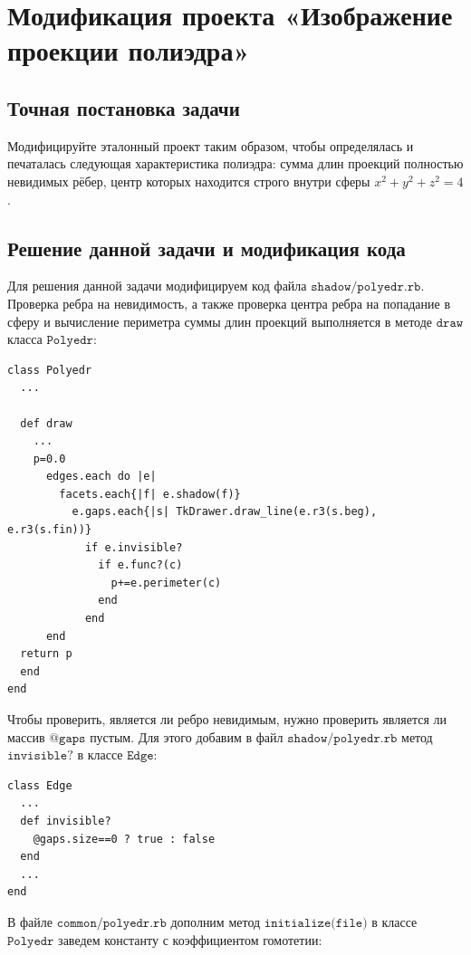 \section{Модификация проекта «Изображение проекции полиэдра»}

\subsection*{Точная постановка задачи}
Модифицируйте эталонный проект таким образом, 
чтобы определялась и печаталась следующая характеристика полиэдра: 
сумма длин проекций полностью невидимых рёбер, центр которых находится 
строго внутри сферы $x^2+y^2+z^2=4$.

\subsection*{Решение данной задачи и модификация кода}
Для решения данной задачи модифицируем код файла $\texttt{shadow/polyedr.rb}$.
Проверка ребра на невидимость, а также проверка центра ребра на попадание в 
сферу и вычисление периметра суммы длин проекций выполняется в методе $\texttt{draw}$ класса $\texttt{Polyedr}$:


\begin{small}
\begin{verbatim}
class Polyedr 
  ...

  def draw
    ...
    p=0.0
      edges.each do |e|
        facets.each{|f| e.shadow(f)}
          e.gaps.each{|s| TkDrawer.draw_line(e.r3(s.beg), e.r3(s.fin))}
            if e.invisible?
              if e.func?(c)
                p+=e.perimeter(c)
              end
            end
      end
  return p
  end  
end
\end{verbatim}
\end{small}

Чтобы проверить, является ли ребро невидимым, нужно проверить является ли массив $\texttt{@gaps}$ пустым. Для этого 
добавим в файл $\texttt{shadow/polyedr.rb}$ метод $\texttt{invisible?}$ в классе $\texttt{Edge}$:
\begin{small}
\begin{verbatim}
class Edge 
  ...
  def invisible?
    @gaps.size==0 ? true : false
  end
  ...
end
\end{verbatim}
\end{small}
В файле $\texttt{common/polyedr.rb}$ дополним метод $\texttt{initialize(file)}$ в классе 
$\texttt{Polyedr}$ заведем константу с коэффициентом гомотетии:


